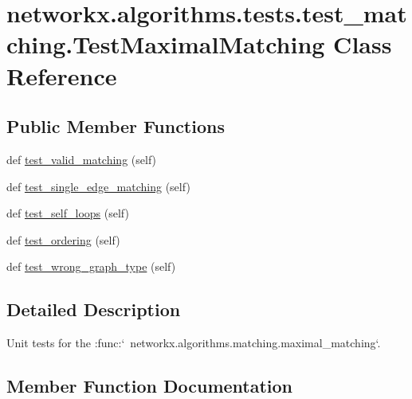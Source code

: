 \hypertarget{classnetworkx_1_1algorithms_1_1tests_1_1test__matching_1_1TestMaximalMatching}{}\section{networkx.\+algorithms.\+tests.\+test\+\_\+matching.\+Test\+Maximal\+Matching Class Reference}
\label{classnetworkx_1_1algorithms_1_1tests_1_1test__matching_1_1TestMaximalMatching}
\subsection*{Public Member Functions}
\begin{DoxyCompactItemize}
\item 
def \hyperlink{classnetworkx_1_1algorithms_1_1tests_1_1test__matching_1_1TestMaximalMatching_af8dab97eaefa7740943e0073b50e31de}{test\+\_\+valid\+\_\+matching} (self)
\item 
def \hyperlink{classnetworkx_1_1algorithms_1_1tests_1_1test__matching_1_1TestMaximalMatching_a7e8aa515a6fa92a3c3ec449ec3d91eaf}{test\+\_\+single\+\_\+edge\+\_\+matching} (self)
\item 
def \hyperlink{classnetworkx_1_1algorithms_1_1tests_1_1test__matching_1_1TestMaximalMatching_a2cc95e57c315ebee01371e49b86a6f8e}{test\+\_\+self\+\_\+loops} (self)
\item 
def \hyperlink{classnetworkx_1_1algorithms_1_1tests_1_1test__matching_1_1TestMaximalMatching_ae5261f30c67567d4c8ad50be89070d3c}{test\+\_\+ordering} (self)
\item 
def \hyperlink{classnetworkx_1_1algorithms_1_1tests_1_1test__matching_1_1TestMaximalMatching_a89e835fbf06a4418b13b193e1af8be2a}{test\+\_\+wrong\+\_\+graph\+\_\+type} (self)
\end{DoxyCompactItemize}


\subsection{Detailed Description}
\begin{DoxyVerb}Unit tests for the
:func:`~networkx.algorithms.matching.maximal_matching`.\end{DoxyVerb}
 

\subsection{Member Function Documentation}
\mbox{\label{classnetworkx_1_1algorithms_1_1tests_1_1test__matching_1_1TestMaximalMatching_ae5261f30c67567d4c8ad50be89070d3c}} 
